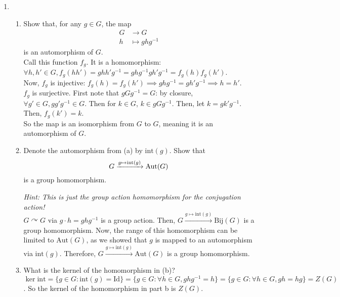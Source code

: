 \documentclass{amsart}
\begin{document}
\begin{enumerate}[itemsep=0.2in]
\begin{enumerate}
    
\end{enumerate}

\item 
\begin{enumerate}
	\item Show that, for any $g\in G$, the map 
\begin{align*}
G&\to G\\
h&\mapsto ghg^{-1}
\end{align*}
is an automorphism of $G$.\\

Call this function $f_g$. It is a homomorphism: $\forall h,h'\in G,f_g(hh')=ghh'g^{-1}=ghg^{-1}gh'g^{-1}=f_g(h)f_g(h')$. \\

Now, $f_g$ is injective: $f_g(h)=f_g(h')\implies ghg^{-1}=gh'g^{-1}\implies h=h'$.\\

$f_g$ is surjective. First note that $gGg^{-1}=G$: by closure, $\forall g'\in G,gg'g^{-1}\in G$. Then for $k\in G$, $k\in gGg^{-1}$. Then, let $k=gk'g^{-1}$. Then, $f_g(k')=k$. \\

So the map is an isomorphism from $G$ to $G$, meaning it is an automorphism of $G$. \\


\item Denote the automorphism from (a) by $\mathrm{int}(g)$. Show that
\[
G\xrightarrow{g\mapsto \mathrm{int}(g)}\operatorname{Aut}(G)
\]
is a group homomorphism.

\emph{Hint: This is just the group action homomorphism for the conjugation action!}\\

$G\curvearrowright G$ via $g\cdot h=ghg^{-1}$ is a group action. Then, $G\xrightarrow{g\mapsto\mathrm{int}(g)}\mathrm{Bij}(G)$ is a group homomorphism. Now, the range of this homomorphism can be limited to $\mathrm{Aut}(G)$, as we showed that $g$ is mapped to an automorphism via $\mathrm{int}(g)$. Therefore, $G\xrightarrow{g\mapsto\mathrm{int}(g)}\mathrm{Aut}(G)$ is a group homomorphism.\\


\item What is the kernel of the homomorphism in (b)?\\

$\ker\mathrm{int}=\{g\in G:\mathrm{int}(g)=\mathrm{Id}\}=\{g\in G:\forall h\in G,ghg^{-1}=h\}=\{g\in G:\forall h\in G,gh=hg\}=Z(G)$. So the kernel of the homomorphism in part b is $Z(G)$.

\end{enumerate}


\end{enumerate}
\end{document}
